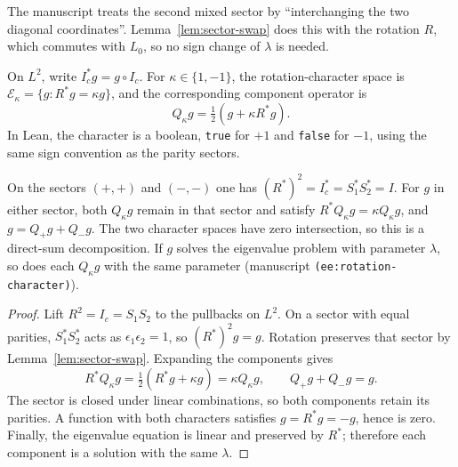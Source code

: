 \begin{remark}
The manuscript treats the second mixed sector by ``interchanging the two
diagonal coordinates''. Lemma~\ref{lem:sector-swap} does this with the
rotation $R$, which commutes with $L_0$, so no sign change of $\lambda$ is
needed.
\end{remark}

\begin{definition}
\label{def:rotation-characters}
\leanok
On $L^2$, write $I_c^*g=g\circ I_c$. For $\kappa\in\{1,-1\}$, the rotation-character
space is $\mathcal E_\kappa=\{g:R^*g=\kappa g\}$, and the corresponding component
operator is
\[
  Q_\kappa g=\tfrac12(g+\kappa R^*g).
\]
In Lean, the character is a boolean, \texttt{true} for $+1$ and
\texttt{false} for $-1$, using the same sign convention as the parity sectors.
\end{definition}

\begin{lemma}
\label{lem:rotation-characters}
\leanok
On the sectors $(+,+)$ and $(-,-)$ one has $(R^*)^2=I_c^*=S_1^*S_2^*=I$.
For $g$ in either sector, both $Q_\kappa g$ remain in that sector and satisfy
$R^*Q_\kappa g=\kappa Q_\kappa g$, and $g=Q_+g+Q_-g$. The two character spaces
have zero intersection, so this is a direct-sum decomposition. If $g$ solves
the eigenvalue problem with parameter $\lambda$, so does each $Q_\kappa g$
with the same parameter (manuscript \texttt{(ee:rotation-character)}).
\end{lemma}

\begin{proof}
\leanok
Lift $R^2=I_c=S_1S_2$ to the pullbacks on $L^2$. On a sector with equal
parities, $S_1^*S_2^*$ acts as $\epsilon_1\epsilon_2=1$, so $(R^*)^2g=g$.
Rotation preserves that sector by Lemma~\ref{lem:sector-swap}. Expanding the
components gives
\[
  R^*Q_\kappa g=\tfrac12(R^*g+\kappa g)=\kappa Q_\kappa g,
  \qquad Q_+g+Q_-g=g.
\]
The sector is closed under linear combinations, so both components retain
its parities. A function with both characters satisfies $g=R^*g=-g$, hence
is zero. Finally, the eigenvalue equation is linear and preserved by $R^*$;
therefore each component is a solution with the same $\lambda$.
\end{proof}

